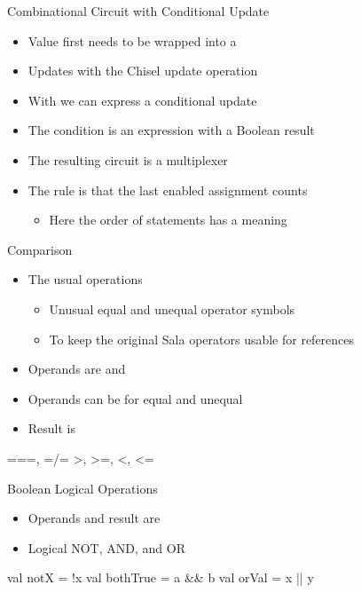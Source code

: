 \begin{frame}[fragile]{Combinational Circuit with Conditional Update}
\begin{itemize}
\item Value first needs to be wrapped into a 
\item Updates with the Chisel update operation \code{:=}
\item With  we can express a conditional update
\item The condition is an expression with a Boolean result
\item The resulting circuit is a multiplexer
\item The rule is that the last enabled assignment counts
\begin{itemize}
\item Here the order of statements has a meaning
\end{itemize}
\end{itemize}
\end{frame}

\begin{frame}[fragile]{Comparison}
\begin{itemize}
\item The usual operations
\begin{itemize}
\item Unusual equal and unequal operator symbols
\item To keep the original Sala operators usable for references
\end{itemize}
\item Operands are  and 
\item Operands can be  for equal and unequal
\item Result is 
\end{itemize}
\begin{chisel}
===, =/=
>, >=, <, <=
\end{chisel}
\end{frame}

\begin{frame}[fragile]{Boolean Logical Operations}
\begin{itemize}
\item Operands and result are 
\item Logical NOT, AND, and OR
\end{itemize}
\begin{chisel}
val notX = !x
val bothTrue = a && b
val orVal = x || y
\end{chisel}
\end{frame}

